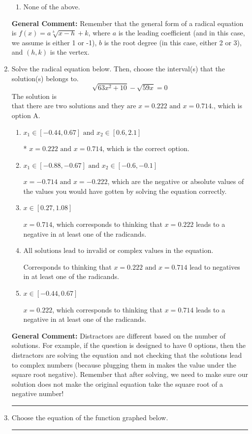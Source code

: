 \documentclass{extbook}[14pt]
\newcommand{\litem}[1]{\item #1

\rule{\textwidth}{0.4pt}}
\begin{document}
\begin{enumerate}
{\begin{enumerate}[label=\Alph*.]
\begin{multicols}{2}
\end{multicols}\item None of the above.\end{enumerate}
\textbf{General Comment:} Remember that the general form of a radical equation is $ f(x) = a \sqrt[b]{x - h} + k $, where $a$ is the leading coefficient (and in this case, we assume is either 1 or -1), $b$ is the root degree (in this case, either 2 or 3), and $(h, k)$ is the vertex.
}
\litem{
Solve the radical equation below. Then, choose the interval(s) that the solution(s) belongs to.
\[ \sqrt{63 x^2 + 10} - \sqrt{59 x} = 0 \]The solution is \( \text{that there are two solutions and they are } x = 0.222 \text{ and } x = 0.714. \), which is option A.\begin{enumerate}[label=\Alph*.]
\item \( x_1 \in [-0.44, 0.67] \text{ and } x_2 \in [0.6,2.1] \)

* $x = 0.222 \text{ and } x = 0.714$, which is the correct option.
\item \( x_1 \in [-0.88, -0.67] \text{ and } x_2 \in [-0.6,-0.1] \)

$x = -0.714 \text{ and } x = -0.222$, which are the negative or absolute values of the values you would have gotten by solving the equation correctly.
\item \( x \in [0.27,1.08] \)

$x = 0.714$, which corresponds to thinking that $x = 0.222$ leads to a negative in at least one of the radicands.
\item \( \text{All solutions lead to invalid or complex values in the equation.} \)

Corresponds to thinking that $x = 0.222 \text{ and } x = 0.714$ lead to negatives in at least one of the radicands.
\item \( x \in [-0.44,0.67] \)

$x = 0.222$, which corresponds to thinking that $x = 0.714$ leads to a negative in at least one of the radicands.
\end{enumerate}

\textbf{General Comment:} Distractors are different based on the number of solutions. For example, if the question is designed to have 0 options, then the distractors are solving the equation and not checking that the solutions lead to complex numbers (because plugging them in makes the value under the square root negative). Remember that after solving, we need to make sure our solution does not make the original equation take the square root of a negative number!
}
\litem{
Choose the equation of the function graphed below.

}
\end{enumerate}
\end{document}
